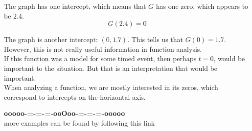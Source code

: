 \documentclass{ximera}
\begin{document}
The graph has one intercept, which means that $G$ has one zero, which appears to be $2.4$. \\

\[  G(2.4) = 0  \]




The graph is another intercept: $(0, 1.7)$. This tells us that $G(0)=1.7$.  However, this is not really useful information in function analysis. \\


If this function was a model for some timed event, then perhaps $t = 0$, would be important to the situation.  But that is an interpretation that would be important. \\

When analyzing a function, we are mostly interested in its zeros, which correspond to intercepts on the horizontal axis.






















\begin{center}
\textbf{\textcolor{green!50!black}{ooooo-=-=-=-ooOoo-=-=-=-ooooo}} \\

more examples can be found by following this link\\ 

\end{center}
\end{document}
